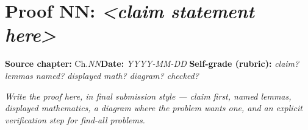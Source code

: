 \documentclass[11pt]{article}
\begin{document}
\section*{Proof NN: \emph{<claim statement here>}}
\textbf{Source chapter:} Ch.\emph{NN}\quad \textbf{Date:} \emph{YYYY-MM-DD}\quad
\textbf{Self-grade (rubric):} \emph{claim? lemmas named? displayed math? diagram? checked?}
\medskip

\emph{Write the proof here, in final submission style — claim first, named lemmas,
displayed mathematics, a diagram where the problem wants one, and an explicit
verification step for find-all problems.}
\end{document}
